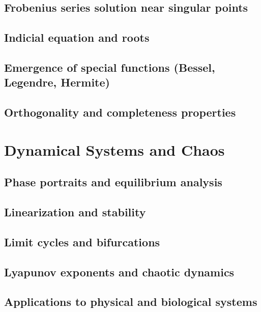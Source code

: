 \subsection{Frobenius series solution near singular points}
\subsection{Indicial equation and roots}
\subsection{Emergence of special functions (Bessel, Legendre, Hermite)}
\subsection{Orthogonality and completeness properties}

\section{Dynamical Systems and Chaos}
\subsection{Phase portraits and equilibrium analysis}
\subsection{Linearization and stability}
\subsection{Limit cycles and bifurcations}
\subsection{Lyapunov exponents and chaotic dynamics}
\subsection{Applications to physical and biological systems}
